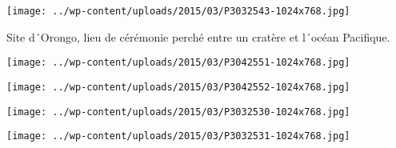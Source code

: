 \centerline{\texttt{[image: ../wp-content/uploads/2015/03/P3032543-1024x768.jpg]} } 
 \newline
 Site d´Orongo, lieu de cérémonie perché entre un cratère et l´océan Pacifique. \newline
 \newline
\centerline{\texttt{[image: ../wp-content/uploads/2015/03/P3042551-1024x768.jpg]} } 
 \newline
\centerline{\texttt{[image: ../wp-content/uploads/2015/03/P3042552-1024x768.jpg]} } 
 \newline
 \newline
\centerline{\texttt{[image: ../wp-content/uploads/2015/03/P3032530-1024x768.jpg]} } 
 \newline
\centerline{\texttt{[image: ../wp-content/uploads/2015/03/P3032531-1024x768.jpg]} } 
 \newline
  \newline
  \newline
  \newline
  \newline
  \newline
  \newline
  \newline

\newpage
 
